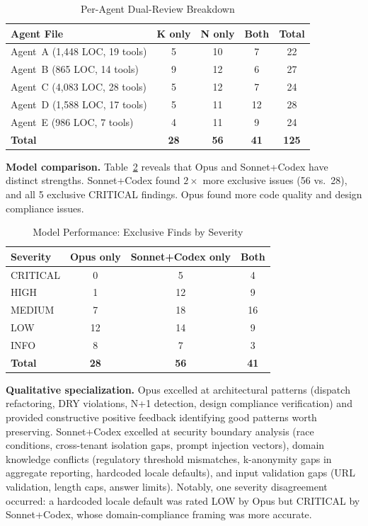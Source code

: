 \documentclass[11pt,a4paper]{article}
\begin{document}
\begin{table}[htbp]
\caption{Per-Agent Dual-Review Breakdown}
\label{tab:issuetypes}
\centering
\footnotesize
\begin{tabular}{@{}lcccc@{}}
\toprule
\textbf{Agent File} & \textbf{K only} & \textbf{N only} & \textbf{Both} & \textbf{Total} \\
\midrule
Agent~A (1{,}448 LOC, 19 tools) & 5 & 10 & 7 & 22 \\
Agent~B (865 LOC, 14 tools) & 9 & 12 & 6 & 27 \\
Agent~C (4{,}083 LOC, 28 tools) & 5 & 12 & 7 & 24 \\
Agent~D (1{,}588 LOC, 17 tools) & 5 & 11 & 12 & 28 \\
Agent~E (986 LOC, 7 tools) & 4 & 11 & 9 & 24 \\
\midrule
\textbf{Total} & \textbf{28} & \textbf{56} & \textbf{41} & \textbf{125} \\
\bottomrule
\end{tabular}
\end{table}

\textbf{Model comparison.} Table~\ref{tab:modelcompare} reveals that Opus and Sonnet+Codex have distinct strengths. Sonnet+Codex found $2\times$ more exclusive issues (56 vs.\ 28), and all 5 exclusive CRITICAL findings. Opus found more code quality and design compliance issues.

\begin{table}[htbp]
\caption{Model Performance: Exclusive Finds by Severity}
\label{tab:modelcompare}
\centering
\footnotesize
\begin{tabular}{@{}lccc@{}}
\toprule
\textbf{Severity} & \textbf{Opus only} & \textbf{Sonnet+Codex only} & \textbf{Both} \\
\midrule
CRITICAL & 0 & 5 & 4 \\
HIGH & 1 & 12 & 9 \\
MEDIUM & 7 & 18 & 16 \\
LOW & 12 & 14 & 9 \\
INFO & 8 & 7 & 3 \\
\midrule
\textbf{Total} & \textbf{28} & \textbf{56} & \textbf{41} \\
\bottomrule
\end{tabular}
\end{table}

\textbf{Qualitative specialization.} Opus excelled at architectural patterns (dispatch refactoring, DRY violations, N+1 detection, design compliance verification) and provided constructive positive feedback identifying good patterns worth preserving. Sonnet+Codex excelled at security boundary analysis (race conditions, cross-tenant isolation gaps, prompt injection vectors), domain knowledge conflicts (regulatory threshold mismatches, k-anonymity gaps in aggregate reporting, hardcoded locale defaults), and input validation gaps (URL validation, length caps, answer limits). Notably, one severity disagreement occurred: a hardcoded locale default was rated LOW by Opus but CRITICAL by Sonnet+Codex, whose domain-compliance framing was more accurate.
\end{document}
